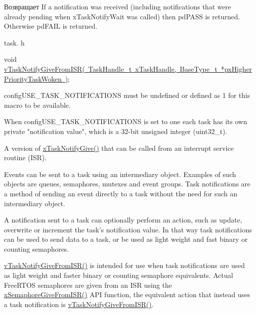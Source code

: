 \begin{DoxyReturn}{Возвращает}
If a notification was received (including notifications that were already pending when x\+Task\+Notify\+Wait was called) then pd\+P\+A\+SS is returned. Otherwise pd\+F\+A\+IL is returned.
\end{DoxyReturn}
task. h 
\begin{DoxyPre}void \mbox{\hyperlink{task_8h_a4a4bcf98ad282a596e13f3f30582a11b}{vTaskNotifyGiveFromISR( TaskHandle\_t xTaskHandle, BaseType\_t *pxHigherPriorityTaskWoken )}};\end{DoxyPre}



\begin{DoxyPre}configUSE\_TASK\_NOTIFICATIONS must be undefined or defined as 1 for this macro
to be available.\end{DoxyPre}



\begin{DoxyPre}When configUSE\_TASK\_NOTIFICATIONS is set to one each task has its own private
"notification value", which is a 32-bit unsigned integer (uint32\_t).\end{DoxyPre}



\begin{DoxyPre}A version of \mbox{\hyperlink{task_8h_ac60cbd05577a3e4f3c3587dd9b213930}{xTaskNotifyGive()}} that can be called from an interrupt service
routine (ISR).\end{DoxyPre}



\begin{DoxyPre}Events can be sent to a task using an intermediary object.  Examples of such
objects are queues, semaphores, mutexes and event groups.  Task notifications
are a method of sending an event directly to a task without the need for such
an intermediary object.\end{DoxyPre}



\begin{DoxyPre}A notification sent to a task can optionally perform an action, such as
update, overwrite or increment the task's notification value.  In that way
task notifications can be used to send data to a task, or be used as light
weight and fast binary or counting semaphores.\end{DoxyPre}



\begin{DoxyPre}\mbox{\hyperlink{task_8h_a4a4bcf98ad282a596e13f3f30582a11b}{vTaskNotifyGiveFromISR()}} is intended for use when task notifications are
used as light weight and faster binary or counting semaphore equivalents.
Actual FreeRTOS semaphores are given from an ISR using the
\mbox{\hyperlink{semphr_8h_a68aa43df8b2a0dbe17d05fad74670ef0}{xSemaphoreGiveFromISR()}} API function, the equivalent action that instead uses
a task notification is \mbox{\hyperlink{task_8h_a4a4bcf98ad282a596e13f3f30582a11b}{vTaskNotifyGiveFromISR()}}.\end{DoxyPre}



